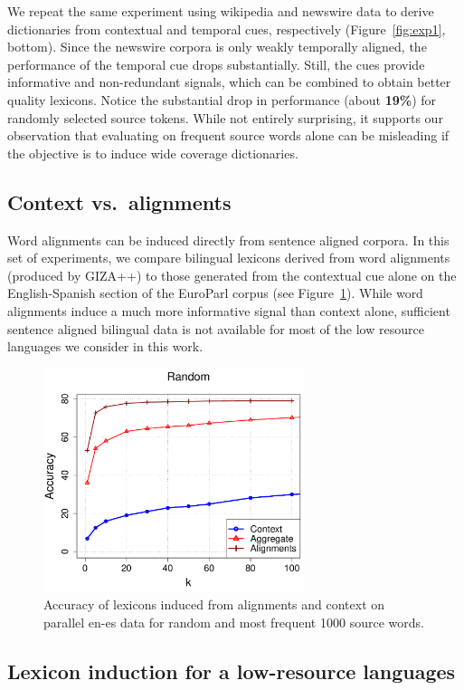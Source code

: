 \documentclass{article}
\newcommand{\figref}[1]{Figure~\ref{#1}}
\begin{document}
We repeat the same experiment using wikipedia and newswire data to derive dictionaries from contextual and temporal cues, respectively (\figref{fig:exp1}, bottom).  Since the newswire corpora is only weakly temporally aligned, the performance of the temporal cue drops substantially.  Still, the cues provide informative and non-redundant signals, which can be combined to obtain better quality lexicons.  Notice the substantial drop in performance (about {\bf 19\%}) for randomly selected source tokens.  While not entirely surprising, it supports our observation that evaluating on frequent source words alone can be misleading if the objective is to induce wide coverage dictionaries.

\subsection{Context vs.\ alignments} 

Word alignments can be induced directly from sentence aligned corpora.  In this set of experiments, we compare bilingual lexicons derived from word alignments (produced by GIZA++) to those generated from the contextual cue alone on the English-Spanish section of the EuroParl corpus (see \figref{fig:exp2}). While word alignments induce a much more informative signal than context alone, sufficient sentence aligned bilingual data is not available for most of the low resource languages we consider in this work.\\

\begin{figure}[h!]
\centerline{\mbox{\includegraphics[width=3in]{figures/exp2/alignvscontext}}}
\caption{Accuracy of lexicons induced from alignments and context on parallel en-es data for random and most frequent 1000 source words.}
\label{fig:exp2}
\end{figure}

\subsection{Lexicon induction for a low-resource languages}
\end{document}
